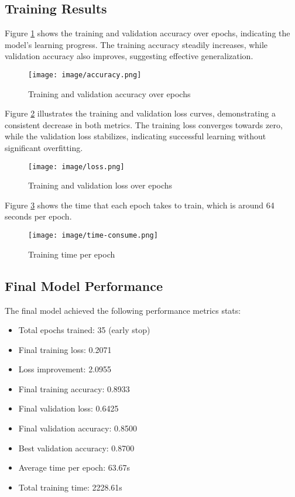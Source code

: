 \documentclass[conference]{IEEEtran}
\begin{document}
\subsection{Training Results}

Figure \ref{fig:accuracy} shows the training and validation accuracy over epochs, indicating the model's learning progress. The training accuracy steadily increases, while validation accuracy also improves, suggesting effective generalization.
\begin{figure}[H]
    \centering
    \texttt{[image: image/accuracy.png]}
    \caption{Training and validation accuracy over epochs}
    \label{fig:accuracy}
\end{figure}

Figure \ref{fig:loss} illustrates the training and validation loss curves, demonstrating a consistent decrease in both metrics. The training loss converges towards zero, while the validation loss stabilizes, indicating successful learning without significant overfitting.
\begin{figure}[H]
    \centering
    \texttt{[image: image/loss.png]}
    \caption{Training and validation loss over epochs}
    \label{fig:loss}
\end{figure}


\noindent Figure \ref{fig:loss_diff} shows the time that each epoch takes to train, which is around 64 seconds per epoch.
\begin{figure}[H]
    \centering
    \texttt{[image: image/time-consume.png]}
    \caption{Training time per epoch}
    \label{fig:loss_diff}
\end{figure}

\subsection{Final Model Performance}
The final model achieved the following performance metrics stats:
\begin{itemize}
  \item Total epochs trained: 35 (early stop)
  \item Final training loss: 0.2071
  \item Loss improvement: 2.0955
  \item Final training accuracy: 0.8933
  \item Final validation loss: 0.6425
  \item Final validation accuracy: 0.8500
  \item Best validation accuracy: 0.8700
  \item Average time per epoch: 63.67s
  \item Total training time: 2228.61s
\end{itemize}
\end{document}
